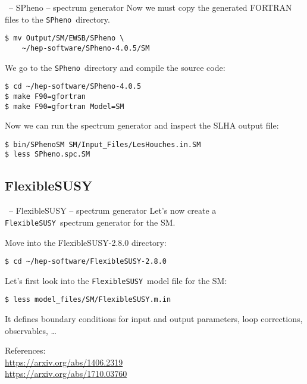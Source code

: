 \documentclass[11pt]{beamer}
\newcommand{\FlexibleSUSY}{\texttt{FlexibleSUSY}}
\newcommand{\SPheno}{\texttt{SPheno}}
\begin{document}

\begin{frame}[fragile]{\insertsection\ -- SPheno -- spectrum generator}
  Now we must copy the generated FORTRAN files to the \SPheno\
  directory.
  \begin{lstlisting}
$ mv Output/SM/EWSB/SPheno \
    ~/hep-software/SPheno-4.0.5/SM\end{lstlisting}%
  We go to the \SPheno\ directory and compile the source code:
  \begin{lstlisting}
$ cd ~/hep-software/SPheno-4.0.5
$ make F90=gfortran
$ make F90=gfortran Model=SM\end{lstlisting}%
  Now we can run the spectrum generator and inspect the SLHA output file:
  \begin{lstlisting}
$ bin/SPhenoSM SM/Input_Files/LesHouches.in.SM
$ less SPheno.spc.SM\end{lstlisting}
\end{frame}


\subsection{FlexibleSUSY}


\begin{frame}[fragile]{\insertsection\ -- FlexibleSUSY -- spectrum generator}
  Let's now create a \FlexibleSUSY\ spectrum generator for the SM.

  \bigskip

  Move into the FlexibleSUSY-2.8.0 directory:
  \begin{lstlisting}
$ cd ~/hep-software/FlexibleSUSY-2.8.0\end{lstlisting}%
  Let's first look into the \FlexibleSUSY\ model file for the SM:
  \begin{lstlisting}
$ less model_files/SM/FlexibleSUSY.m.in\end{lstlisting}%
  It defines boundary conditions for input and output parameters, loop
  corrections, observables, \ldots

  \bigskip

  References:\\
  \url{https://arxiv.org/abs/1406.2319}\\
  \url{https://arxiv.org/abs/1710.03760}

\end{frame}
\end{document}

